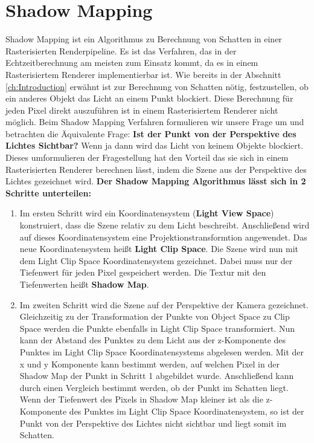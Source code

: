 \chapter{Shadow Mapping} %
\label{section:shadow-mapping}
Shadow Mapping \cite{Williams1978} ist ein Algorithmus zu Berechnung von Schatten 
in einer Rasterisierten Renderpipeline. 
Es ist das Verfahren, das in der Echtzeitberechnung am meisten zum Einsatz kommt, 
da es in einem Rasterisiertem Renderer implementierbar ist.
\newline \newline
Wie bereits in der Abschnitt \ref{ch:Introduction} erwähnt ist zur Berechnung von Schatten nötig, festzustellen,
ob ein anderes Objekt das Licht an einem Punkt blockiert.
Diese Berechnung für jeden Pixel direkt auszuführen ist in einem Rasterisiertem 
Renderer nicht möglich.
Beim Shadow Mapping Verfahren formulieren wir unsere Frage um und betrachten 
die Äquivalente Frage:
\textbf{Ist der Punkt von der Perspektive des Lichtes Sichtbar?}
Wenn ja dann wird das Licht von keinem Objekte blockiert.
Dieses umformulieren der Fragestellung hat den Vorteil das sie sich in
einem Rasterisierten Renderer berechnen lässt, indem die Szene aus der Perspektive des Lichtes gezeichnet wird.
\newline
\newline
\textbf{Der Shadow Mapping Algorithmus lässt sich in 2 Schritte 
unterteilen:}
\begin{enumerate}
  \item Im ersten Schritt wird ein Koordinatensystem (\textbf{Light View Space}) konstruiert, 
    dass die Szene relativ zu dem Licht beschreibt.
    Anschließend wird auf dieses Koordinatensystem eine Projektionstransformtion angewendet.
    Das neue Koordinatensystem heißt \textbf{Light Clip Space}.
    Die Szene wird nun mit dem Light Clip Space Koordinatensystem gezeichnet.
    Dabei muss nur der Tiefenwert für jeden Pixel gespeichert werden.
    Die Textur mit den Tiefenwerten heißt \textbf{Shadow Map}.
  \item Im zweiten Schritt wird die Szene auf der Perspektive der Kamera gezeichnet.
    Gleichzeitig zu der Transformation der Punkte von Object Space zu Clip Space
    werden die Punkte ebenfalls in Light Clip Space transformiert.
    Nun kann der Abstand des Punktes zu dem Licht 
    aus der z-Komponente des Punktes im Light Clip Space Koordinatensystems abgelesen werden.
    Mit der x und y Komponente kann bestimmt werden, auf welchen Pixel in der Shadow Map der Punkt in Schritt 1 abgebildet wurde.
    Anschließend kann durch einen Vergleich bestimmt werden, ob der Punkt im Schatten liegt.
    Wenn der Tiefenwert des Pixels in Shadow Map kleiner ist als die z-Komponente des Punktes im Light Clip Space Koordinatensystem,
    so ist der Punkt von der Perspektive des Lichtes nicht sichtbar und liegt somit im Schatten.
\end{enumerate}

